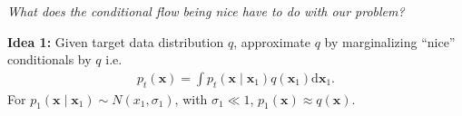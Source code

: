 \documentclass{beamer}
\begin{document}
\begin{frame}
\begin{columns}
\begin{column}{0.49\linewidth}
\begin{figure}
        \end{figure}
        \end{column}
    \end{columns}
\end{frame}
\begin{frame}
    \begin{center}
        \emph{What does the conditional flow being nice have to do with our problem?}
    \end{center}
\end{frame}
\begin{frame}
    \textbf{Idea 1:} Given target data distribution \( q \), approximate \( q \) by marginalizing ``nice'' conditionals by \( q \) i.e.
    \begin{align*}
        p_t(\mathbf{x}) = \int p_t(\mathbf{x} \mid \mathbf{x}_{1}) q(\mathbf{x}_{1}) \mathrm{d}\mathbf{x}_{1} \tag*{(Marginal Density)}
    .\end{align*}
    For \( p_{1}(\mathbf{x} \mid \mathbf{x}_{1}) \sim N(x_{1}, \sigma_{1}) \), with \( \sigma_{1} \ll 1 \), \( p_{1}(\mathbf{x}) \approx q(\mathbf{x}) \). \\
    \vskip 5pt
    
\end{frame}
\end{document}
